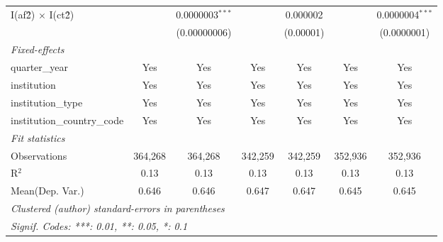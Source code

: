 \begin{tabular}{lcccccc}
   I(af\^2) $\times$ I(ct\^2)         &               & 0.0000003$^{***}$ &               & 0.000002        &               & 0.0000004$^{***}$\\   
                                      &               & (0.00000006)      &               & (0.00001)       &               & (0.0000001)\\   
   \midrule
   \emph{Fixed-effects}\\
   quarter\_year                      & Yes           & Yes               & Yes           & Yes             & Yes           & Yes\\  
   institution                        & Yes           & Yes               & Yes           & Yes             & Yes           & Yes\\  
   institution\_type                  & Yes           & Yes               & Yes           & Yes             & Yes           & Yes\\  
   institution\_country\_code         & Yes           & Yes               & Yes           & Yes             & Yes           & Yes\\  
   \midrule
   \emph{Fit statistics}\\
   Observations                       & 364,268       & 364,268           & 342,259       & 342,259         & 352,936       & 352,936\\  
   R$^2$                              & 0.13          & 0.13              & 0.13          & 0.13            & 0.13          & 0.13\\  
Mean(Dep. Var.) & 0.646 & 0.646 & 0.647 & 0.647 & 0.645 & 0.645 \\
   \midrule \midrule
   \multicolumn{7}{l}{\emph{Clustered (author) standard-errors in parentheses}}\\
   \multicolumn{7}{l}{\emph{Signif. Codes: ***: 0.01, **: 0.05, *: 0.1}}\\
\end{tabular}
\par\endgroup
